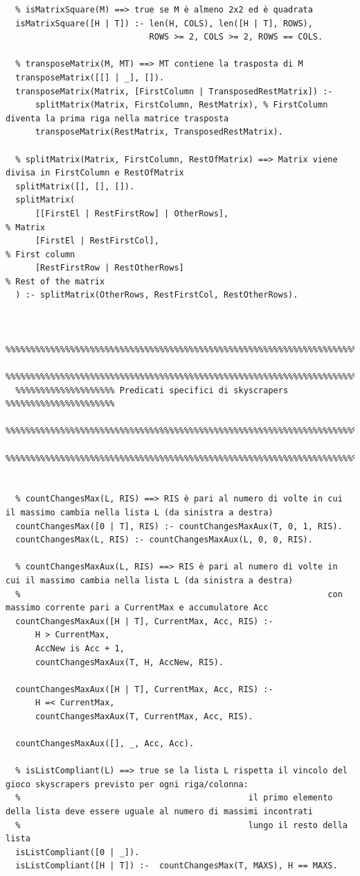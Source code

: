\documentclass{article}
\begin{document}
\begin{lstlisting}
  % isMatrixSquare(M) ==> true se M è almeno 2x2 ed è quadrata
  isMatrixSquare([H | T]) :- len(H, COLS), len([H | T], ROWS), 
                             ROWS >= 2, COLS >= 2, ROWS == COLS.
  
  % transposeMatrix(M, MT) ==> MT contiene la trasposta di M
  transposeMatrix([[] | _], []).
  transposeMatrix(Matrix, [FirstColumn | TransposedRestMatrix]) :- 
      splitMatrix(Matrix, FirstColumn, RestMatrix), % FirstColumn diventa la prima riga nella matrice trasposta
      transposeMatrix(RestMatrix, TransposedRestMatrix).
  
  % splitMatrix(Matrix, FirstColumn, RestOfMatrix) ==> Matrix viene divisa in FirstColumn e RestOfMatrix
  splitMatrix([], [], []).
  splitMatrix(
      [[FirstEl | RestFirstRow] | OtherRows],   							% Matrix
      [FirstEl | RestFirstCol],  														 	% First column
      [RestFirstRow | RestOtherRows]												 	% Rest of the matrix
  ) :- splitMatrix(OtherRows, RestFirstCol, RestOtherRows).
  
  
  %%%%%%%%%%%%%%%%%%%%%%%%%%%%%%%%%%%%%%%%%%%%%%%%%%%%%%%%%%%%%%%%%%%%%%%%%%%%%%
  %%%%%%%%%%%%%%%%%%%%%%%%%%%%%%%%%%%%%%%%%%%%%%%%%%%%%%%%%%%%%%%%%%%%%%%%%%%%%%
  %%%%%%%%%%%%%%%%%%%% Predicati specifici di skyscrapers %%%%%%%%%%%%%%%%%%%%%%
  %%%%%%%%%%%%%%%%%%%%%%%%%%%%%%%%%%%%%%%%%%%%%%%%%%%%%%%%%%%%%%%%%%%%%%%%%%%%%%
  %%%%%%%%%%%%%%%%%%%%%%%%%%%%%%%%%%%%%%%%%%%%%%%%%%%%%%%%%%%%%%%%%%%%%%%%%%%%%%
  
  
  % countChangesMax(L, RIS) ==> RIS è pari al numero di volte in cui il massimo cambia nella lista L (da sinistra a destra) 
  countChangesMax([0 | T], RIS) :- countChangesMaxAux(T, 0, 1, RIS).
  countChangesMax(L, RIS) :- countChangesMaxAux(L, 0, 0, RIS).
  
  % countChangesMaxAux(L, RIS) ==> RIS è pari al numero di volte in cui il massimo cambia nella lista L (da sinistra a destra)
  % 															 con massimo corrente pari a CurrentMax e accumulatore Acc
  countChangesMaxAux([H | T], CurrentMax, Acc, RIS) :-
      H > CurrentMax,
      AccNew is Acc + 1,
      countChangesMaxAux(T, H, AccNew, RIS).
   
  countChangesMaxAux([H | T], CurrentMax, Acc, RIS) :-
      H =< CurrentMax,
      countChangesMaxAux(T, CurrentMax, Acc, RIS).
   
  countChangesMaxAux([], _, Acc, Acc).
  
  % isListCompliant(L) ==> true se la lista L rispetta il vincolo del gioco skyscrapers previsto per ogni riga/colonna:
  % 											 il primo elemento della lista deve essere uguale al numero di massimi incontrati
  % 											 lungo il resto della lista
  isListCompliant([0 | _]). 
  isListCompliant([H | T]) :-  countChangesMax(T, MAXS), H == MAXS. 
  

\end{lstlisting}
\end{document}
